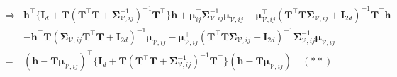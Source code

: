 \documentclass[12pt]{article}
\newcommand{\0}{\mathbf{0}}
\begin{document}
\begin{eqnarray*}
& \Rightarrow & \mathbf{h}^{\top} \{ \mathbf{I}_d + \mathbf{T} ( \mathbf{T}^{\top} \mathbf{T} + \boldsymbol{\Sigma}_{\boldsymbol{\mathcal{V}}, ij}^{-1} )^{-1} \mathbf{T}^{\top} \} \mathbf{h} + \boldsymbol{\mu}_{ij}^{\top} \boldsymbol{\Sigma}_{\boldsymbol{\mathcal{V}}, ij}^{-1} \boldsymbol{\mu}_{\boldsymbol{\mathcal{V}}, ij} - \boldsymbol{\mu}_{\boldsymbol{\mathcal{V}}, ij}^{\top} ( \mathbf{T}^{\top} \mathbf{T} \boldsymbol{\Sigma}_{\boldsymbol{\mathcal{V}}, ij} + \mathbf{I}_{2d} )^{-1} \mathbf{T}^{\top} \mathbf{h}  \\
& & -  \mathbf{h}^{\top} \mathbf{T} ( \boldsymbol{\Sigma}_{\boldsymbol{\mathcal{V}}, ij} \mathbf{T}^{\top} \mathbf{T}  + \mathbf{I}_{2d} )^{-1} \boldsymbol{\mu}_{\boldsymbol{\mathcal{V}}, ij} -  \boldsymbol{\mu}_{\boldsymbol{\mathcal{V}}, ij}^{\top} ( \mathbf{T}^{\top} \mathbf{T} \boldsymbol{\Sigma}_{\boldsymbol{\mathcal{V}}, ij}  + \mathbf{I}_{2d} )^{-1} \boldsymbol{\Sigma}_{\boldsymbol{\mathcal{V}}, ij}^{-1} \boldsymbol{\mu}_{\boldsymbol{\mathcal{V}}, ij} \\
& = & ( \mathbf{h} -  \mathbf{T}\boldsymbol{\mu}_{\boldsymbol{\mathcal{V}}, ij} )^{\top} \{ \mathbf{I}_d + \mathbf{T} ( \mathbf{T}^{\top} \mathbf{T} + \boldsymbol{\Sigma}_{\boldsymbol{\mathcal{V}}, ij}^{-1} )^{-1} \mathbf{T}^{\top} \} ( \mathbf{h} -  \mathbf{T}\boldsymbol{\mu}_{\boldsymbol{\mathcal{V}}, ij} ) \quad (**)
\end{eqnarray*}
\end{document}
